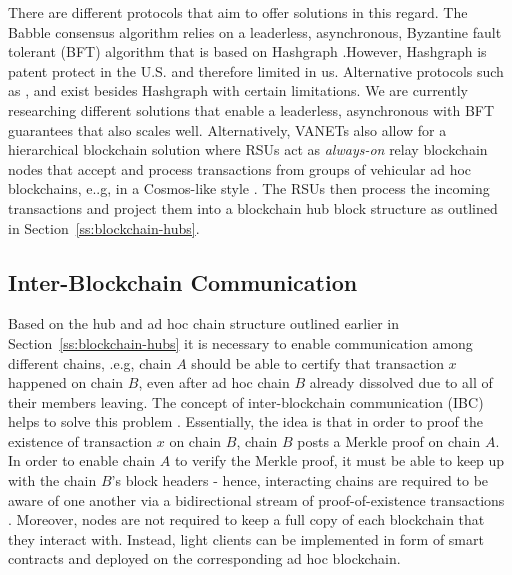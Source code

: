 \documentclass{llncs}
\begin{document}
{			There are different protocols that aim to offer solutions in this regard. The Babble consensus algorithm \cite{babbleConsensus} relies on a leaderless, asynchronous, Byzantine fault tolerant (BFT) algorithm that is based on Hashgraph \cite{hashgraphWhitepaper}.However, Hashgraph is patent protect in the U.S. and therefore limited in us. Alternative protocols such as \cite{miller2016honey}, \cite{bibid} and \cite{bibid} exist besides Hashgraph with certain limitations. We are currently researching different solutions that enable a leaderless, asynchronous with BFT guarantees that also scales well. Alternatively, VANETs also allow for a hierarchical blockchain solution where RSUs act as \textit{always-on} relay blockchain nodes that accept and process transactions from groups of vehicular ad hoc blockchains, e..g, in a Cosmos-like style \cite{cosmosWhitepaper}. The RSUs then process the incoming transactions and project them into a blockchain hub block structure as outlined in Section~\ref{ss:blockchain-hubs}.
		
				
		\subsection{Inter-Blockchain Communication}
			\label{ss:inter-blockchain-communication}
			
			Based on the hub and ad hoc chain structure outlined earlier in Section~\ref{ss:blockchain-hubs} it is necessary to enable communication among different chains, .e.g, chain $A$ should be able to certify that transaction $x$ happened on chain $B$, even after ad hoc chain $B$ already dissolved due to all of their members leaving. The concept of inter-blockchain communication (IBC) helps to solve this problem \cite{monetWhitepaper}\cite{chen2017inter}\cite{cosmosWhitepaper}. Essentially, the idea is that in order to proof the existence of transaction $x$ on chain $B$, chain $B$ posts a Merkle proof on chain $A$. In order to enable chain $A$ to verify the Merkle proof, it must be able to keep up with the chain $B$'s block headers - hence, interacting chains are required to be aware of one another via a bidirectional stream of proof-of-existence transactions \cite{cosmosWhitepaper}. Moreover, nodes are not required to keep a full copy of each blockchain that they interact with. Instead, light clients can be implemented in form of smart contracts and deployed on the corresponding ad hoc blockchain.	

}
\end{document}
